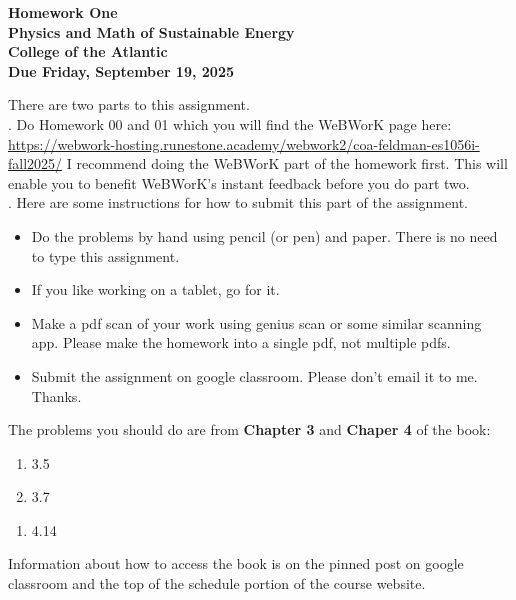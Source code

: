 \documentclass[12pt]{article}
\begin{document}
\pagestyle{empty}
 
\begin{center}
{\LARGE {\bf Homework One}}\\
\bigskip
{\Large {\bf Physics and Math of Sustainable Energy}}\\
\bigskip
{\Large {\bf College of the Atlantic}}\\
\bigskip
{ {\bf Due Friday, September 19, 2025}}\\ 
\end{center}
\medskip


\noindent There are two parts to this assignment.\\

.  Do Homework 00 and 01 which you
will find the WeBWorK page here:
\url{https://webwork-hosting.runestone.academy/webwork2/coa-feldman-es1056i-fall2025/}
I recommend doing the WeBWorK part of the homework first. This will
enable you to benefit WeBWorK's instant feedback before you do part
two.\\ 


.  Here are some
instructions for how to submit this part of the assignment.
\begin{itemize}
\item Do the problems by hand using pencil (or pen) and paper.
  There is no need to type this assignment.
\item If you like working on a tablet, go for it. 
\item Make a pdf scan of your work using genius scan or some
  similar scanning app. Please make the homework into a single
  pdf, not multiple pdfs.
\item Submit the assignment on google classroom.  Please don't
  email it to me. Thanks.\\
\end{itemize}

\noindent The problems you should do are from {\bf Chapter 3} and {\bf
  Chaper 4} of the book:  

\begin{enumerate}
\setlength{\itemsep}{-1mm}
  \item 3.5
  \item 3.7\\
\end{enumerate}

\begin{enumerate}
  \setlength{\itemsep}{-1mm}
  \item 4.14
\end{enumerate}

\noindent Information about how to access the book is on the
pinned post on google classroom and the top of the schedule portion of
the course website.  
\end{document}
